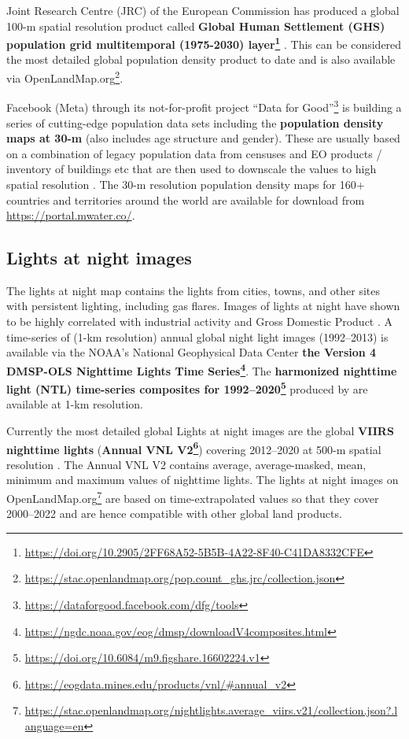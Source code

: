 \documentclass[
  graybox,natbib,nospthms]{svmono}
\renewcommand{\href}[2]{#2 (\url{#1})}
\renewcommand{\href}[2]{#2\footnote{\url{#1}}}
\begin{document}
Joint Research Centre (JRC) of the European Commission has produced a global 100-m
spatial resolution product called \textbf{\href{https://doi.org/10.2905/2FF68A52-5B5B-4A22-8F40-C41DA8332CFE}{Global Human Settlement (GHS) population grid multitemporal (1975-2030) layer}}
\citep{schiavina2022ghsl}. This can be considered the most detailed global population density product to date
and is also \href{https://stac.openlandmap.org/pop.count_ghs.jrc/collection.json}{available via OpenLandMap.org}.

Facebook (Meta) through its not-for-profit project \href{https://dataforgood.facebook.com/dfg/tools}{``Data for Good''} is
building a series of cutting-edge population data sets including the \textbf{population density maps at 30-m}
(also includes age structure and gender). These are usually based on a combination
of legacy population data from censuses and EO products / inventory of buildings etc
that are then used to downscale the values to high spatial resolution \citep{tiecke2017mapping}.
The 30-m resolution population density maps for 160+ countries and territories around the world
are available for download from \url{https://portal.mwater.co/}.

\hypertarget{lights-at-night-images}{%
\subsection{Lights at night images}\label{lights-at-night-images}}

The lights at night map contains the lights from cities, towns, and other sites
with persistent lighting, including gas flares. Images of lights at night have shown
to be highly correlated with industrial activity and Gross Domestic Product \citep{doll2006mapping}.
A time-series of (1-km resolution) annual global night light images (1992--2013) is available via the NOAA's
National Geophysical Data Center \textbf{\href{https://ngdc.noaa.gov/eog/dmsp/downloadV4composites.html}{the Version 4 DMSP-OLS Nighttime Lights Time Series}}.
The \textbf{\href{https://doi.org/10.6084/m9.figshare.16602224.v1}{harmonized nighttime light (NTL) time-series composites for 1992--2020}}
produced by \citet{zhao2022global} are available at 1-km resolution.

Currently the most detailed global Lights at night images are
the global \textbf{VIIRS nighttime lights} (\textbf{\href{https://eogdata.mines.edu/products/vnl/\#annual_v2}{Annual VNL V2}})
covering 2012--2020 at 500-m spatial resolution \citep{elvidge2021annual}.
The Annual VNL V2 contains average, average-masked, mean, minimum and maximum values of nighttime lights.
The \href{https://stac.openlandmap.org/nightlights.average_viirs.v21/collection.json?.language=en}{lights at night images on OpenLandMap.org} are based on time-extrapolated values so that they cover 2000--2022
and are hence compatible with other global land products.
\end{document}
